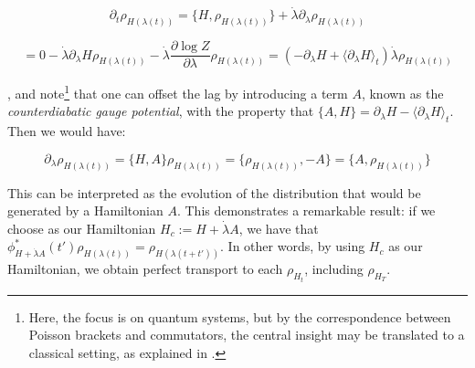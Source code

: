 \documentclass{article}
\begin{document}


$$
\partial_t\rho_{H(\lambda(t))} = \{H, \rho_{H(\lambda(t))}\} + \dot\lambda\partial_\lambda \rho_{H(\lambda(t))}
$$

$$
= 0 - \dot\lambda\partial_\lambda H\rho_{H(\lambda(t))} - \dot\lambda\frac{\partial \log Z}{\partial \lambda}\rho_{H(\lambda(t))} = (-\partial_\lambda H + \langle \partial_\lambda H\rangle_t) \dot\lambda\rho_{H(\lambda(t))}
$$




\cite{demirplak2003adiabatic}, \cite{berry2009transitionless} and \cite{vaikuntanathan2011escorted, guery2023driving} note\footnote{Here, the focus is on quantum systems, but by the correspondence between Poisson brackets and commutators, the central insight may be translated to a classical setting, as explained in \cite{crooks1998nonequilibrium}.} that one can offset the lag by introducing a term $A$, known as the \emph{counterdiabatic gauge potential}, with the property that $\{A, H\} = \partial_\lambda H - \langle \partial_\lambda H\rangle_t$. Then we would have:

$$
\partial_\lambda\rho_{H(\lambda(t))} = \{H, A\}\rho_{H(\lambda(t))} = \{\rho_{H(\lambda(t))}, -A\} = \{A, \rho_{H(\lambda(t))}\} 
$$

This can be interpreted as the evolution of the distribution that would be generated by a Hamiltonian $A$. This demonstrates a remarkable result: if we choose as our Hamiltonian $H_c := H + \dot\lambda A$, we have that $\phi^*_{H+\dot\lambda A}(t')\rho_{H(\lambda(t))} = \rho_{H(\lambda(t+t'))}$. In other words, by using $H_c$ as our Hamiltonian, we obtain perfect transport to each $\rho_{H_t}$, including $\rho_{H_T}$.
\end{document}
